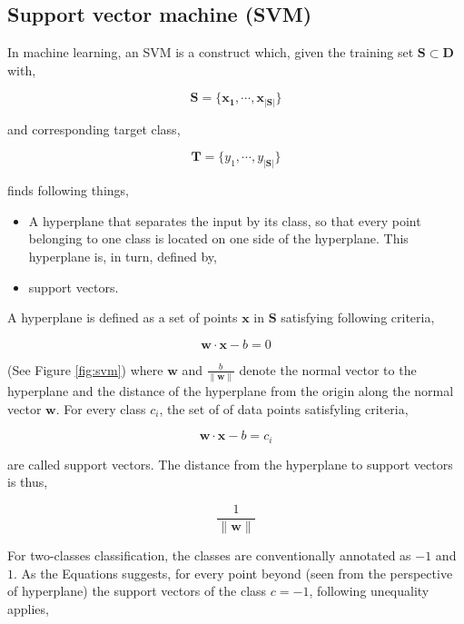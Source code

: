 \documentclass[pdftex,12pt,a4paper]{report}
\begin{document}
\subsection{Support vector machine (SVM)}
\label{subsection:svm}

In machine learning, an SVM is a construct which, given the training set $\mathbf{S} \subset \mathbf{D}$ with,

$$
\mathbf{S} = \{\mathbf{x_1}, \cdots, \mathbf{x}_{ \vert \mathbf{S} \vert }\}
$$

and corresponding target class,

$$
\mathbf{T} = \{y_1, \cdots, y_{\vert \mathbf{S} \vert}\}
$$

finds following things,

\begin{itemize}
\item A hyperplane that separates the input by its class, so that every point belonging to one class is located on one side of the hyperplane. This hyperplane is, in turn, defined by,
\item support vectors.
\end{itemize}

A hyperplane is defined as a set of points $\mathbf{x}$ in $\mathbf{S}$ satisfying following criteria,

\begin{equation}
\mathbf{w} \cdot \mathbf{x} - b = 0
\label{equation:hyperplane}
\end{equation}

(See Figure \ref{fig:svm}) where $\mathbf{w}$ and $\frac{b}{\| \mathbf{w} \|}$ denote the normal vector to the hyperplane and the distance of the hyperplane from the origin along the normal vector $\mathbf{w}$. For every class $c_i$, the set of of data points satisfyling criteria,

\begin{equation}
\mathbf{w} \cdot \mathbf{x} - b = c_i
\label{equation:support_vector}
\end{equation}

are called support vectors. The distance from the hyperplane to support vectors is thus,

$$\frac{1}{\| \mathbf{w} \|}$$

For two-classes classification, the classes are conventionally annotated as $-1$ and $1$. As the Equations \label{equation:support_vector} suggests, for every point beyond (seen from the perspective of hyperplane) the support vectors of the class $c = -1$, following unequality applies,
\end{document}
